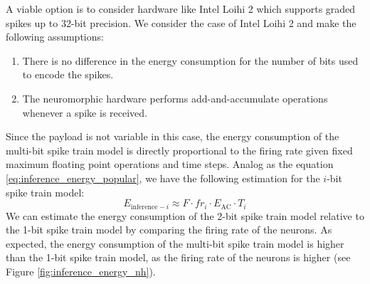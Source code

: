         A viable option is to consider hardware like Intel Loihi 2 which supports graded spikes up to 32-bit precision. We consider the case of Intel Loihi 2 and make the following assumptions: 
        \begin{enumerate}
            \item There is no difference in the energy consumption for the number of bits used to encode the spikes.
            \item The neuromorphic hardware performs add-and-accumulate operations whenever a spike is received. 
        \end{enumerate}
        Since the payload is not variable in this case, the energy consumption of the multi-bit spike train model is directly proportional to the firing rate given fixed maximum floating point operations and time steps. Analog as the equation \ref{eq:inference_energy_popular}, we have the following estimation for the $i$-bit spike train model:
        \begin{equation}
            E_{\text{inference}-i} \approx F \cdot fr_i \cdot E_{\text{AC}} \cdot T_i
        \end{equation}
        We can estimate the energy consumption of the 2-bit spike train model relative to the 1-bit spike train model by comparing the firing rate of the neurons. As expected, the energy consumption of the multi-bit spike train model is higher than the 1-bit spike train model, as the firing rate of the neurons is higher (see Figure \ref{fig:inference_energy_nh}).
